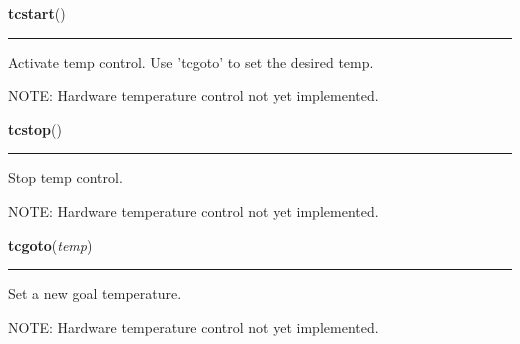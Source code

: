     \label{pydsp:tcstart}

    \vspace{0.5ex}

    \begin{boxedminipage}{\textwidth}

    \raggedright \textbf{tcstart}()

    \vspace{-1.5ex}

    \rule{\textwidth}{0.5\fboxrule}
    Activate temp control. Use 'tcgoto' to set the desired temp.

    NOTE: Hardware temperature control not yet implemented.

    \vspace{1ex}

    \end{boxedminipage}

    \label{pydsp:tcstop}

    \vspace{0.5ex}

    \begin{boxedminipage}{\textwidth}

    \raggedright \textbf{tcstop}()

    \vspace{-1.5ex}

    \rule{\textwidth}{0.5\fboxrule}
    Stop temp control.

    NOTE: Hardware temperature control not yet implemented.

    \vspace{1ex}

    \end{boxedminipage}

    \label{pydsp:tcgoto}

    \vspace{0.5ex}

    \begin{boxedminipage}{\textwidth}

    \raggedright \textbf{tcgoto}(\textit{temp})

    \vspace{-1.5ex}

    \rule{\textwidth}{0.5\fboxrule}
    Set a new goal temperature.

    NOTE: Hardware temperature control not yet implemented.

    \vspace{1ex}

    \end{boxedminipage}

